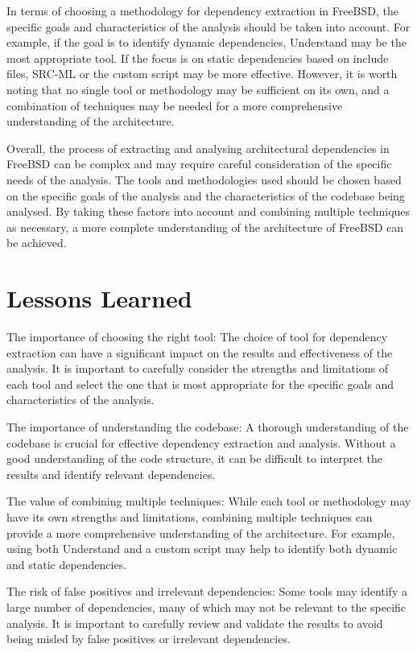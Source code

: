 \documentclass[12pt, dvipsnames, a4paper]{article}
\begin{document}
In terms of choosing a methodology for dependency extraction in FreeBSD, the specific goals and characteristics of the analysis should be taken into account. For example, if the goal is to identify dynamic dependencies, Understand may be the most appropriate tool. If the focus is on static dependencies based on include files, SRC-ML or the custom script may be more effective. However, it is worth noting that no single tool or methodology may be sufficient on its own, and a combination of techniques may be needed for a more comprehensive understanding of the architecture.

Overall, the process of extracting and analysing architectural dependencies in FreeBSD can be complex and may require careful consideration of the specific needs of the analysis. The tools and methodologies used should be chosen based on the specific goals of the analysis and the characteristics of the codebase being analysed. By taking these factors into account and combining multiple techniques as necessary, a more complete understanding of the architecture of FreeBSD can be achieved.

\section{Lessons Learned}
The importance of choosing the right tool: The choice of tool for dependency extraction can have a significant impact on the results and effectiveness of the analysis. It is important to carefully consider the strengths and limitations of each tool and select the one that is most appropriate for the specific goals and characteristics of the analysis.

The importance of understanding the codebase: A thorough understanding of the codebase is crucial for effective dependency extraction and analysis. Without a good understanding of the code structure, it can be difficult to interpret the results and identify relevant dependencies.

The value of combining multiple techniques: While each tool or methodology may have its own strengths and limitations, combining multiple techniques can provide a more comprehensive understanding of the architecture. For example, using both Understand and a custom script may help to identify both dynamic and static dependencies.

The risk of false positives and irrelevant dependencies: Some tools may identify a large number of dependencies, many of which may not be relevant to the specific analysis. It is important to carefully review and validate the results to avoid being misled by false positives or irrelevant dependencies.
\end{document}
